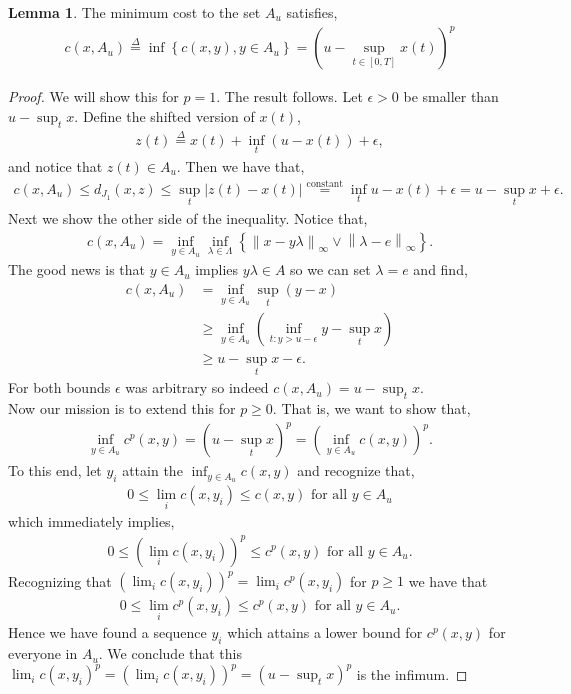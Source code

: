 \documentclass[12pt]{article}
\newcommand\norm[1]{\left\lVert#1\right\rVert}
\newcommand{\define}{\overset{\Delta}{=}}
\theoremstyle{definition}
\theoremstyle{definition}
\newtheorem{lemma}{Lemma}
\theoremstyle{definition}
\begin{document}
\begin{lemma} The minimum cost to the set $A_u$ satisfies,
\begin{align*}
c(x,A_u) \define\inf\left\{c(x,y),y\in A_u\right\} = \left(u-\sup_{t\in[0,T]}x(t)\right)^p
\end{align*}
\begin{proof}
We will show this for $p=1$. The result follows. Let $\epsilon>0$ be smaller than $u-\sup_t x$. Define the shifted version of $x(t)$,
\begin{align*}
z(t) \define x(t) + \inf_{t}\left(u-x(t)\right)+ \epsilon,
\end{align*}
and notice that $z(t)\in A_u$. Then we have that,
\begin{align*}
c(x,A_u)\leq d_{J_1}(x,z)\leq \sup_t |z(t)-x(t)| \overset{\text{constant}}{=} \inf_t u- x(t)+\epsilon= u-\sup_t x+\epsilon.
\end{align*}
Next we show the other side of the inequality. Notice that,
\begin{align*}
c(x,A_u) = \inf_{y\in A_u}\inf_{\lambda\in \Lambda}\left\{\norm{x-y\lambda}_{\infty}\lor \norm{\lambda-e}_{\infty}\right\}.
\end{align*}
The good news is that $y\in A_u$ implies $y\lambda\in A$ so we can set $\lambda = e$ and find,
\begin{align*}
c(x,A_u) &= \inf_{y\in A_u} \sup_t (y-x)\\
&\geq \inf_{y\in A_u}\left(\inf_{t: y>u-\epsilon} y - \sup_t x\right)\\
&\geq u-\sup_t x-\epsilon.
\end{align*}
For both bounds $\epsilon$ was arbitrary so indeed $c(x,A_u)= u-\sup_t x$.\\

Now our mission is to extend this for $p\geq 0$. That is, we want to show that,
\begin{align*}
\inf_{y\in A_u}c^p(x,y) = (u-\sup_tx)^p = \left(\inf_{y\in A_u} c(x,y)\right)^p.
\end{align*}
To this end, let $y_i$ attain the $\inf_{y\in A_u} c(x,y)$ and recognize that,
\begin{align*}
0\leq \lim_i c(x,y_i)\leq c(x,y) \text{ for all $y\in A_u$}
\end{align*}
which immediately implies,
\begin{align*}
0\leq \left(\lim_i c(x,y_i)\right)^p\leq c^p(x,y) \text{ for all $y\in A_u$}.
\end{align*}
Recognizing that $\left(\lim_i c(x,y_i)\right)^p=\lim_i c^p(x,y_i)$ for $p\geq 1$ we have that 
\begin{align*}
0\leq \lim_i c^p(x,y_i)\leq c^p(x,y) \text{ for all $y\in A_u$}.
\end{align*}
Hence we have found a sequence $y_i$ which attains a lower bound for $c^p(x,y)$ for everyone in $A_u$. We conclude that this $\lim_i c(x,y_i)^p = \left(\lim_i c(x,y_i)\right)^p=\left(u-\sup_t x\right)^p$ is the infimum.
\end{proof}
\end{lemma}
\end{document}

